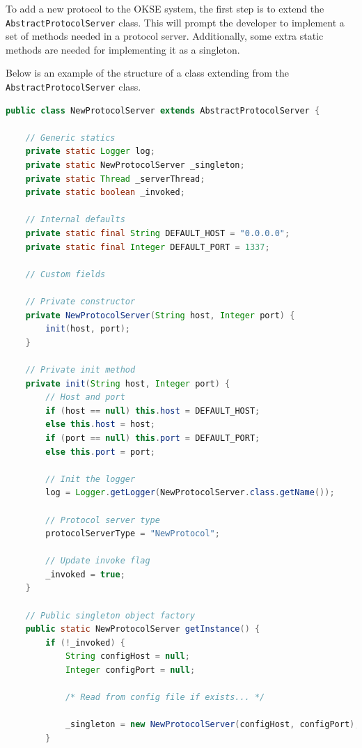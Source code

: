 To add a new protocol to the OKSE system, the first step is to extend the \\\verb!AbstractProtocolServer! class. This will prompt the developer to implement a set of methods needed in a protocol server. Additionally, some extra static methods are needed for implementing it as a singleton.

Below is an example of the structure of a class extending from the \\\verb!AbstractProtocolServer! class.

\begin{lstlisting}[language=Java, captionpos=b, caption=Adding a new protocol, frame=bt, showstringspaces=false]
public class NewProtocolServer extends AbstractProtocolServer {

    // Generic statics
    private static Logger log;
    private static NewProtocolServer _singleton;
    private static Thread _serverThread;
    private static boolean _invoked;
    
    // Internal defaults
    private static final String DEFAULT_HOST = "0.0.0.0";
    private static final Integer DEFAULT_PORT = 1337;
    
    // Custom fields
    
    // Private constructor
    private NewProtocolServer(String host, Integer port) {
        init(host, port);
    }
    
    // Private init method
    private init(String host, Integer port) {
        // Host and port
        if (host == null) this.host = DEFAULT_HOST;
        else this.host = host;
        if (port == null) this.port = DEFAULT_PORT;
        else this.port = port;
        
        // Init the logger
        log = Logger.getLogger(NewProtocolServer.class.getName());
        
        // Protocol server type
        protocolServerType = "NewProtocol";
        
        // Update invoke flag
        _invoked = true;
    }
    
    // Public singleton object factory
    public static NewProtocolServer getInstance() {
        if (!_invoked) {
            String configHost = null;
            Integer configPort = null;
            
            /* Read from config file if exists... */
            
            _singleton = new NewProtocolServer(configHost, configPort);
        }
        

\end{lstlisting}
